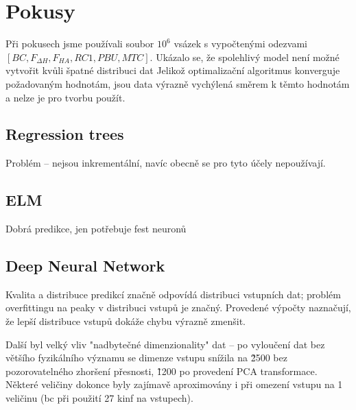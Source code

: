 
\section{Pokusy}
Při pokusech jsme používali soubor $10^6$ vsázek s vypočtenými odezvami $[BC, F_{\Delta H}, F_{HA}, RC1, PBU, MTC]$. Ukázalo se, že 
spolehlivý model není možné vytvořit kvůli špatné distribuci dat 
Jelikož optimalizační algoritmus konverguje požadovaným hodnotám, jsou data výrazně vychýlená směrem k těmto hodnotám a nelze je pro tvorbu použít. 
\subsection{Regression trees}
Problém -- nejsou inkrementální, navíc obecně se pro tyto účely nepoužívají.
\subsection{ELM}
Dobrá predikce, jen potřebuje fest neuronů


\subsection{Deep Neural Network}
Kvalita a distribuce predikcí značně odpovídá distribuci vstupních dat; problém overfittingu na peaky v distribuci vstupů je značný. 
Provedené výpočty naznačují, že lepší distribuce vstupů dokáže chybu výrazně zmenšit. 

Další byl velký vliv "nadbytečné dimenzionality" dat -- po vyloučení dat bez většího fyzikálního významu se dimenze vstupu 
snížila na \~ 2500 bez pozorovatelného zhoršení přesnosti, \~ 1200 po provedení PCA transformace. Některé veličiny dokonce 
byly zajímavě aproximovány i při omezení vstupu na 1 veličinu (bc při použití 27 kinf na vstupech). 

